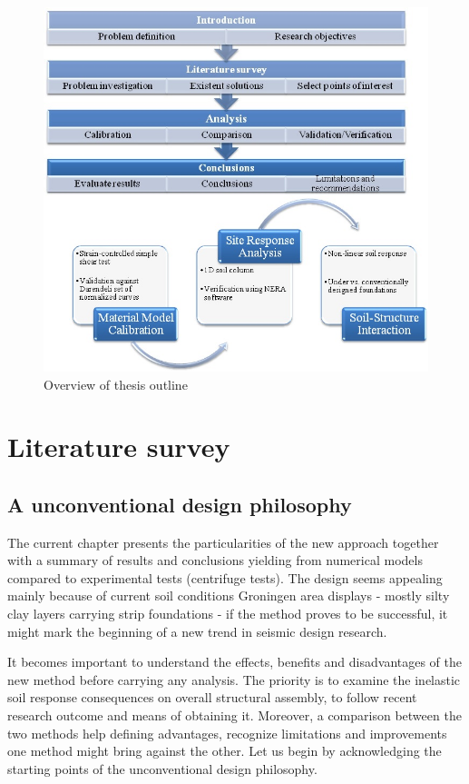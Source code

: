\documentclass[11pt,a4paper]{report}
\begin{document}
\begin{figure}[h!]
	\centering
	\includegraphics[width=0.9\linewidth]{"outline"}
	\caption{Overview of thesis outline}
	\label{outline}
\end{figure}

\chapter{Literature survey}
\section{A unconventional design philosophy}

The current chapter presents the particularities of the new approach together with a summary of results and conclusions yielding from numerical models compared to experimental tests (centrifuge tests). The design seems appealing mainly because of current soil conditions Groningen area displays - mostly silty clay layers carrying strip foundations - if the method proves to be successful, it might mark the beginning of a new trend in seismic design research.

It becomes important to understand the effects, benefits and disadvantages of the new method before carrying any analysis. The priority is to examine the inelastic soil response consequences on overall structural assembly, to follow recent research outcome and means of obtaining it. Moreover, a comparison between the two methods help defining advantages, recognize limitations and improvements one method might bring against the other. Let us begin by acknowledging the starting points of the unconventional design philosophy.
\end{document}
